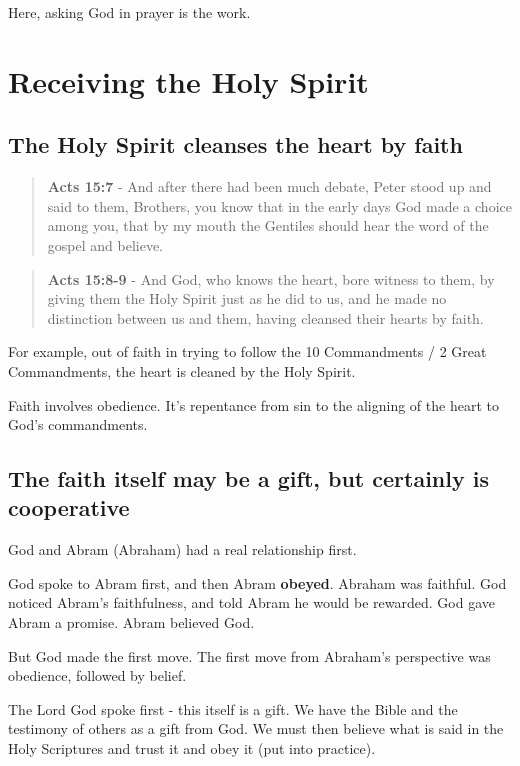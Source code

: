 \documentclass[11pt]{article}
\begin{document}
Here, asking God in prayer is the work.

\section{Receiving the Holy Spirit}
\label{sec:orga2a1628}
\subsection{The Holy Spirit cleanses the heart by faith}
\label{sec:orgae6d717}
\begin{quote}
\textbf{Acts 15:7} - And after there had been much debate, Peter stood up and said to them, Brothers, you know that in the early days God made a choice among you, that by my mouth the Gentiles should hear the word of the gospel and believe.
\end{quote}

\begin{quote}
\textbf{Acts 15:8-9} - And God, who knows the heart, bore witness to them, by giving them the Holy Spirit just as he did to us, and he made no distinction between us and them, having cleansed their hearts by faith.
\end{quote}

For example, out of faith in trying to follow the 10 Commandments / 2 Great Commandments, the heart is cleaned by the Holy Spirit.

Faith involves obedience. It's repentance from sin to the aligning of the heart to God's commandments.

\subsection{The faith itself may be a gift, but certainly is cooperative}
\label{sec:org9337da6}
God and Abram (Abraham) had a real relationship first.

God spoke to Abram first, and then Abram \textbf{obeyed}.
Abraham was faithful.
God noticed Abram's faithfulness, and told Abram he would be rewarded.
God gave Abram a promise.
Abram believed God.

But God made the first move.
The first move from Abraham's perspective was obedience, followed by belief.

The Lord God spoke first - this itself is a gift. We have the Bible and the testimony of others as a gift from God.
We must then believe what is said in the Holy Scriptures and trust it and obey it (put into practice).
\end{document}
